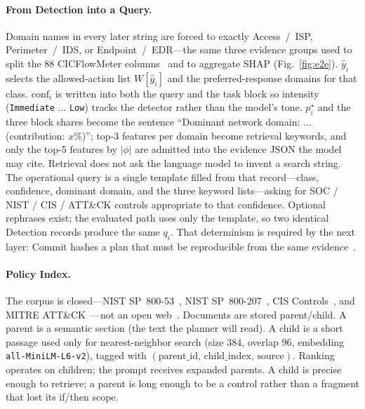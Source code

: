 \paragraph{From Detection into a Query.}
Domain names in every later string are forced to exactly Access~/~ISP, Perimeter~/~IDS, or Endpoint~/~EDR---the same three evidence groups used to split the 88 CICFlowMeter columns~\cite{sharafaldin2018} and to aggregate SHAP (Fig.~\ref{fig:e2e}). $\hat{y}_i$ selects the allowed-action list $W[\hat{y}_i]$ and the preferred-response domains for that class. $\mathrm{conf}_i$ is written into both the query and the task block so intensity (\texttt{Immediate} $\ldots$ \texttt{Low}) tracks the detector rather than the model's tone. $p_i^{\star}$ and the three block shares become the sentence ``Dominant network domain: $\ldots$ (contribution: $x\%$)''; top-3 features per domain become retrieval keywords, and only the top-5 features by $\lvert\phi\rvert$ are admitted into the evidence JSON the model may cite. Retrieval does not ask the language model to invent a search string. The operational query is a single template filled from that record---class, confidence, dominant domain, and the three keyword lists---asking for SOC / NIST / CIS / ATT\&CK controls appropriate to that confidence. Optional rephrases exist; the evaluated path uses only the template, so two identical Detection records produce the same $q_i$. That determinism is required by the next layer: Commit hashes a plan that must be reproducible from the same evidence~\cite{zhang2024exploit}.

\paragraph{Policy Index.}
The corpus is closed---NIST SP~800-53~\cite{nist80053}, NIST SP~800-207~\cite{nist800207}, CIS Controls~\cite{cisv8}, and MITRE ATT\&CK~\cite{mitre_attack}---not an open web~\cite{shajarian2026,fu2026}. Documents are stored parent/child. A parent is a semantic section (the text the planner will read). A child is a short passage used only for nearest-neighbor search (size $384$, overlap $96$, embedding \texttt{all-MiniLM-L6-v2}), tagged with $(\mathrm{parent\_id},\,\mathrm{child\_index},\,\mathrm{source})$. Ranking operates on children; the prompt receives expanded parents. A child is precise enough to retrieve; a parent is long enough to be a control rather than a fragment that lost its if/then scope.

